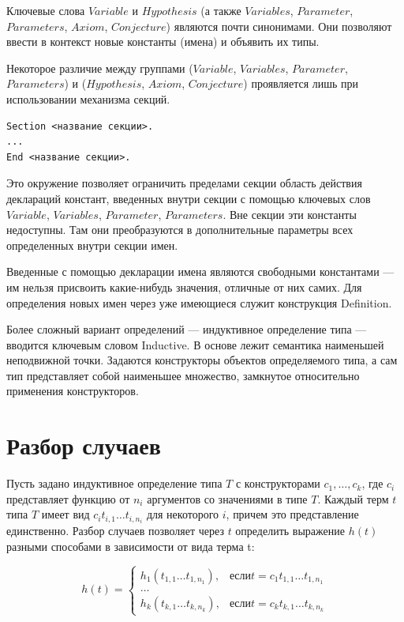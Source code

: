 Ключевые слова $Variable$ и $Hypothesis$ (а также $Variables$, $Parameter$,
$Parameters$, $Axiom$, $Conjecture$) являются почти синонимами. Они позволяют 
ввести в контекст новые константы (имена) и объявить их типы\cite{bertot}.

Некоторое различие между группами ($Variable$, $Variables$, $Parameter$,
$Parameters$) и ($Hypothesis$, $Axiom$, $Conjecture$) проявляется лишь при
использовании механизма секций. 
\begin{verbatim}
Section <название секции>.
...
End <название секции>.
\end{verbatim}
Это окружение позволяет ограничить пределами секции область действия 
деклараций констант, введенных внутри секции с помощью ключевых слов 
$Variable$, $Variables$, $Parameter$, $Parameters$. Вне секции эти константы 
недоступны. Там они преобразуются в дополнительные параметры всех 
определенных внутри секции имен.

Введенные с помощью декларации имена являются свободными константами --- им 
нельзя присвоить какие-нибудь значения, отличные от них самих. Для 
определения новых имен через уже имеющиеся служит конструкция Definition\cite{bertot}.

Более сложный вариант определений --- индуктивное определение типа ---
вводится ключевым словом Inductive. В основе лежит семантика наименьшей 
неподвижной точки. Задаются конструкторы объектов определяемого типа, а сам 
тип представляет собой наименьшее множество, замкнутое относительно 
применения конструкторов\cite{bertot}.

\section{Разбор случаев}
Пусть задано индуктивное определение типа $T$ с конструкторами $c_{1}, \ldots 
, c_{k}$, где $c_{i}$ представляет функцию от $n_{i}$ аргументов со 
значениями в типе $T$. Каждый терм $t$ типа $T$ имеет вид $c_{i}t_{i,1} \ldots t_{i,n_{i}}$ для 
некоторого $i$, причем это представление единственно. Разбор случаев позволяет через $t$ определить 
выражение $h(t)$ разными способами в зависимости от вида терма t\cite{msu}:

\[ h(t) =
  \begin{cases}
    h_{1}(t_{1,1}  \ldots t_{1,n_{1}}),     & если t = c_{1}t_{1,1}  \ldots t_{1,n_{1}}\\
		\ldots \\
     h_{k}(t_{k,1}  \ldots t_{k,n_{k}}),     & если t = c_{k}t_{k,1}  \ldots t_{k,n_{k}}
  \end{cases}
\]

